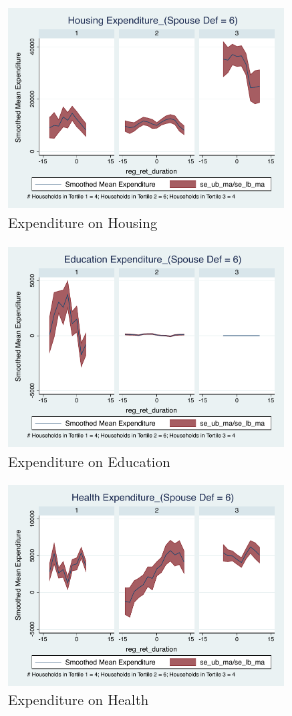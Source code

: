 \documentclass[11pt,onecolumn]{article}
\numberwithin{figure}{section}
\begin{document}
\clearpage

\begin{figure}[h]
	\caption{Expenditure on Housing}
	\centering
	\includegraphics[width=0.65\textwidth]{../ConsumptionPostRetirement_by_SpouseDef_Cats/Smoothed/6/spouse_def_total_housing_real.pdf}
\end{figure}


\begin{figure}[h]
	\caption{Expenditure on Education}
	\centering
	\includegraphics[width=0.65\textwidth]{../ConsumptionPostRetirement_by_SpouseDef_Cats/Smoothed/6/spouse_def_total_education_real.pdf}
\end{figure}
\clearpage

\begin{figure}[h]
	\caption{Expenditure on Health}
	\centering
	\includegraphics[width=0.65\textwidth]{../ConsumptionPostRetirement_by_SpouseDef_Cats/Smoothed/6/spouse_def_total_healthexpense_real.pdf}
\end{figure}
\end{document}
